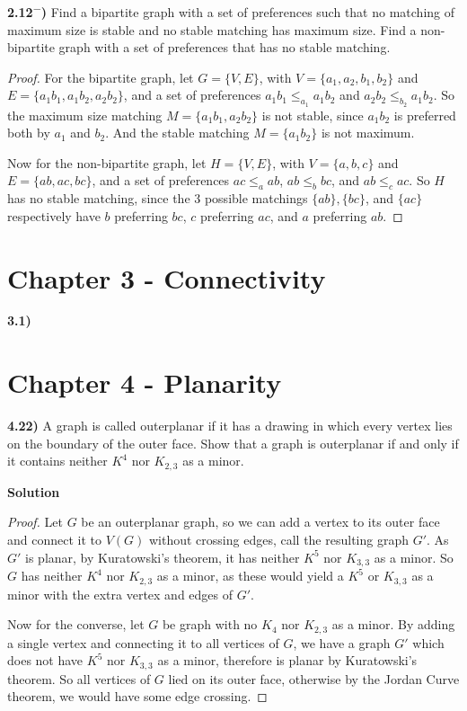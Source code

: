 \documentclass[11pt]{article}
\theoremstyle{plain}
\begin{document}
\textbf{2.12\textsuperscript{$-$})} Find a bipartite graph with a set of preferences such that no matching of maximum size is stable and no stable matching has maximum size. Find a non-bipartite graph with a set of preferences that has no stable matching.

\begin{proof}
For the bipartite graph, let $G=\{V,E\}$, with $V=\{a_1,a_2,b_1,b_2\}$ and $E = \{a_1b_1,a_1b_2,a_2b_2\}$, and a set of preferences $a_1b_1 \leq_{a_1} a_1b_2$ and $a_2b_2 \leq_{b_2} a_1b_2$. So the maximum size matching $M=\{a_1b_1,a_2b_2\}$ is not stable, since $a_1b_2$ is preferred both by $a_1$ and $b_2$. And the stable matching $M=\{a_1b_2\}$ is not maximum.

Now for the non-bipartite graph, let $H=\{V,E\}$, with $V=\{a,b,c\}$ and $E = \{ab,ac,bc\}$, and a set of preferences $ac \leq_{a} ab$, $ab \leq_{b} bc$, and $ab \leq_{c} ac$. So $H$ has no stable matching, since the 3 possible matchings $\{ab\},\{bc\}$, and $\{ac\}$ respectively have $b$ preferring $bc$, $c$ preferring $ac$, and $a$ preferring $ab$.
\end{proof}

\section*{Chapter 3 - Connectivity}

\textbf{3.1)}

\section*{Chapter 4 - Planarity}

\textbf{4.22)} A graph is called outerplanar if it has a drawing in which every vertex lies on the boundary of the outer face. Show that a graph is outerplanar if and only if it contains neither $K^4$ nor $K_{2,3}$ as a minor.

\textbf{Solution}

\begin{proof}
Let $G$ be an outerplanar graph, so we can add a vertex to its outer face and connect it to $V(G)$ without crossing edges, call the resulting graph $G'$. As $G'$ is planar, by Kuratowski's theorem, it has neither $K^5$ nor $K_{3,3}$ as a minor. So $G$ has neither $K^4$ nor $K_{2,3}$ as a minor, as these would yield a $K^5$ or $K_{3,3}$ as a minor with the extra vertex and edges of $G'$.

Now for the converse, let $G$ be graph with no $K_4$ nor $K_{2,3}$ as a minor. By adding a single vertex and connecting it to all vertices of $G$, we have a graph $G'$ which does not have $K^5$ nor $K_{3,3}$ as a minor, therefore is planar by Kuratowski's theorem. So all vertices of $G$ lied on its outer face, otherwise by the Jordan Curve theorem, we would have some edge crossing. 
\end{proof}
\end{document}
